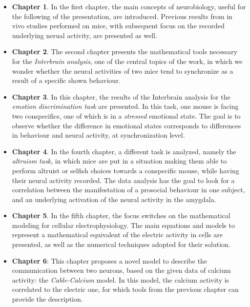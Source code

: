 \documentclass[12pt, a4paper]{report}
\begin{document}
	\begin{itemize}
		\item \textbf{Chapter 1}. In the first chapter, the main concepts of neurobiology, useful for the following of the presentation, are introduced. Previous results from in vivo studies performed on mice, with subsequent focus on the recorded underlying nerual activity, are presented as well. 
		
		\item \textbf{Chapter 2}. The second chapter presents the mathematical tools necessary for the \textit{Interbrain analysis}, one of the central topics of the work, in which we wonder whether the neural activities of two mice tend to synchronize as a result of a specific shown behaviour. 
		
		\item \textbf{Chapter 3}. In this chapter, the results of the Interbrain analysis for the \textit{emotion discrimination task} are presented. In this task, one mouse is facing two conspecifics, one of which is in a \textit{stressed} emotional state. The goal is to observe whether the difference in emotional states corresponds to differences in behaviour and neural activity, at synchronization level.
		
		\item \textbf{Chapter 4}. In the fourth chapter, a different task is analyzed, namely the \textit{altruism task}, in which mice are put in a situation making them able to perform altruist or selfish choices towards a conspecific mouse, while having their neural activity recorded. The data analysis has the goal to look for a correlation between the manifestation of a prosocial behaviour in one subject, and an underlying activation of the neural activity in the amygdala.
		
		\item \textbf{Chapter 5}. In the fifth chapter, the focus switches on the mathematical modeling for cellular electrophysiology. The main equations and models to represent a mathematical equivalent of the electric activity in cells are presented, as well as the numerical techniques adopted for their solution.
		
		\item \textbf{Chapter 6}: This chapter proposes a novel model to describe the communication between two neurons, based on the given data of calcium activity: the \textit{Cable-Calcium} model. In this model, the calcium activity is correlated to the electric one, for which tools from the previous chapter can provide the description.
		
		
	\end{itemize}
	
\end{document}
